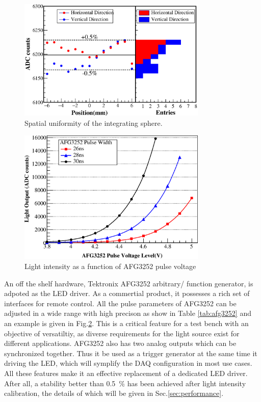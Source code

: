 \documentclass[5p, times]{elsarticle}
\begin{document}
\begin{figure}[h!]
 \centering
 \includegraphics[width=90mm]{uniformity_integratingsphere}
\caption{Spatial uniformity of the integrating sphere.}
\label{fig:uniformity_integratingsphere}
\end{figure} 
  
\begin{figure}[h!]
 \centering
 \includegraphics[width=90mm]{intesityVSvoltage}
\caption{Light intensity as a function of AFG3252 pulse voltage}
\label{fig:afg3252_intensityVSvoltage}
\end{figure} 

An off the shelf hardware, Tektronix AFG3252 arbitrary/ function generator, is adpoted as the LED driver.
As a commertial product, it possesses a rich set of interfaces for remote control.
All the pulse parameters of AFG3252 can be adjusted in a wide range with high precison as show in Table \ref{tab:afg3252} and an example is given in Fig.\ref{fig:afg3252_intensityVSvoltage}.
This is a critical feature for a test bench with an objective of versatiltiy, as diverse requirements for the light source exist for different applications.
AFG3252 also has two analog outputs which can be synchronized together.
Thus it be used as a trigger generator at the same time it driving the LED, which will symplify the DAQ configuration in most use cases. 
All these features make it an effective replacement of a dedicated LED driver. 
After all, a stability better than \SI{0.5}{\percent} has been achieved after light intensity calibration, the details of which will be given in Sec.\ref{sec:performance}.
\end{document}

